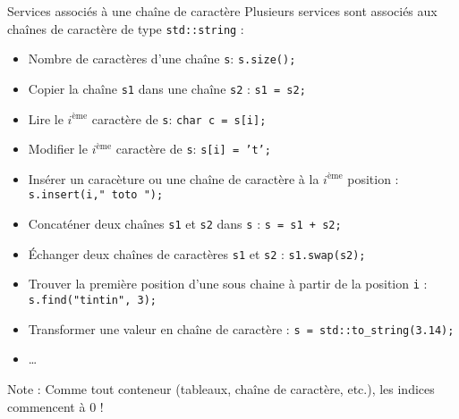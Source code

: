 \documentclass[compress,10pt,aspectratio=169]{beamer}
\begin{document}
\begin{frame}[fragile]{Services associés à une chaîne de caractère}
    \scriptsize
    Plusieurs services sont associés aux chaînes de caractère de type \texttt{std::string} :
    \begin{itemize}
    \item Nombre de caractères d'une chaîne \texttt{s}: \texttt{s.size();}
    \item Copier la chaîne \texttt{s1} dans une chaîne \texttt{s2} : \texttt{s1 = s2;}
    \item Lire le $i^{\mbox{ème}}$ caractère de \texttt{s}: \texttt{char c = s[i];}
    \item Modifier le $i^{\mbox{ème}}$ caractère de \texttt{s}: \texttt{s[i] = 't';}
    \item Insérer un caracèture ou une chaîne de caractère à la $i^{\mbox{ème}}$ position : \texttt{s.insert(i," toto ");}
    \item Concaténer deux chaînes \texttt{s1} et \texttt{s2} dans \texttt{s} : \texttt{s = s1 + s2;}
    \item \'Echanger deux chaînes de caractères \texttt{s1} et \texttt{s2} : \texttt{s1.swap(s2);}
    \item Trouver la première position d'une sous chaine à partir de la position \texttt{i} : \texttt{s.find("tintin", 3);}
    \item Transformer une valeur en chaîne de caractère : \texttt{s = std::to_string(3.14);}
    \item \ldots
    \end{itemize}

    \alert{Note} : Comme tout conteneur (tableaux, chaîne de caractère, etc.), les indices commencent à 0 !
\end{frame}
\end{document}
